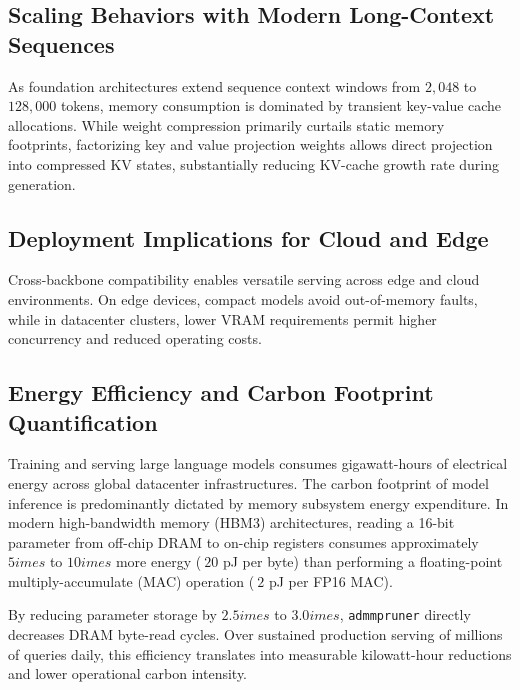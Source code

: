 \subsection{Scaling Behaviors with Modern Long-Context Sequences}
As foundation architectures extend sequence context windows from $2{,}048$ to $128{,}000$ tokens, memory consumption is dominated by transient key-value cache allocations. While weight compression primarily curtails static memory footprints, factorizing key and value projection weights allows direct projection into compressed KV states, substantially reducing KV-cache growth rate during generation.

\subsection{Deployment Implications for Cloud and Edge}
Cross-backbone compatibility enables versatile serving across edge and cloud environments. On edge devices, compact models avoid out-of-memory faults, while in datacenter clusters, lower VRAM requirements permit higher concurrency and reduced operating costs.

\subsection{Energy Efficiency and Carbon Footprint Quantification}
Training and serving large language models consumes gigawatt-hours of electrical energy across global datacenter infrastructures. The carbon footprint of model inference is predominantly dictated by memory subsystem energy expenditure. In modern high-bandwidth memory (HBM3) architectures, reading a 16-bit parameter from off-chip DRAM to on-chip registers consumes approximately $5	imes$ to $10	imes$ more energy ($~20$ pJ per byte) than performing a floating-point multiply-accumulate (MAC) operation ($~2$ pJ per FP16 MAC).

By reducing parameter storage by $2.5	imes$ to $3.0	imes$, \texttt{admmpruner} directly decreases DRAM byte-read cycles. Over sustained production serving of millions of queries daily, this efficiency translates into measurable kilowatt-hour reductions and lower operational carbon intensity.
